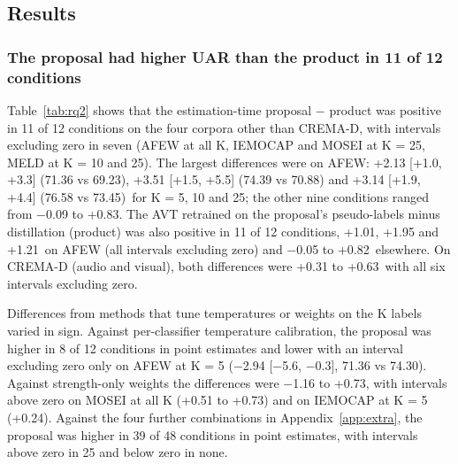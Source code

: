 \subsection{Results}\label{sec:rq2-results}

\subsubsection{The proposal had higher UAR than the product in 11 of 12 conditions}
Table~\ref{tab:rq2} shows that the estimation-time proposal $-$ product was positive in 11 of 12 conditions on the four corpora other than CREMA-D, with intervals excluding zero in seven (AFEW at all K, IEMOCAP and MOSEI at K = 25, MELD at K = 10 and 25). The largest differences were on AFEW: +2.13 [+1.0, +3.3] (71.36 vs 69.23), +3.51 [+1.5, +5.5] (74.39 vs 70.88) and +3.14 [+1.9, +4.4] (76.58 vs 73.45)\pt\ for K = 5, 10 and 25; the other nine conditions ranged from $-$0.09 to +0.83\pt. The AVT retrained on the proposal's pseudo-labels minus distillation (product) was also positive in 11 of 12 conditions, +1.01, +1.95 and +1.21\pt\ on AFEW (all intervals excluding zero) and $-$0.05 to +0.82\pt\ elsewhere. On CREMA-D (audio and visual), both differences were +0.31 to +0.63\pt\ with all six intervals excluding zero.

Differences from methods that tune temperatures or weights on the K labels varied in sign. Against per-classifier temperature calibration, the proposal was higher in 8 of 12 conditions in point estimates and lower with an interval excluding zero only on AFEW at K = 5 ($-$2.94 [$-$5.6, $-$0.3], 71.36 vs 74.30). Against strength-only weights the differences were $-$1.16 to +0.73\pt, with intervals above zero on MOSEI at all K (+0.51 to +0.73\pt) and on IEMOCAP at K = 5 (+0.24\pt). Against the four further combinations in Appendix~\ref{app:extra}, the proposal was higher in 39 of 48 conditions in point estimates, with intervals above zero in 25 and below zero in none.

